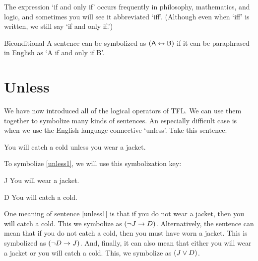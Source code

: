 The expression `if and only if' occurs frequently in philosophy, mathematics, and logic, and sometimes you will see it abbreviated `iff'. (Although even when `iff' is written, we still say `if and only if.') 

\begin{factboxy}{Biconditional}
A sentence can be symbolized as $(\mathsf{A} \leftrightarrow \mathsf{B})$ if it can be paraphrased in English as `A if and only if B'.
\end{factboxy}
	

\section{Unless}\label{s:unless}
We have now introduced all of the logical operators of TFL. We can use them together to symbolize many kinds of sentences. An especially difficult case is when we use the English-language connective `unless'. Take this sentence:

\begin{earg}
\item[\ex{unless1}] You will catch a cold unless you wear a jacket. 
\end{earg}
To symbolize \ref{unless1}, we will use this symbolization key:
	\begin{ekey}
		\item[J] You will wear a jacket.
		\item[D] You will catch a cold.
	\end{ekey}

One meaning of sentence \ref{unless1} is that if you do not wear a jacket, then you will catch a cold. This we symbolize as $({\neg} J \rightarrow D)$. Alternatively, the sentence can mean that if you do not catch a cold, then you must have worn a jacket. This is symbolized as $({\neg} D \rightarrow J)$. And, finally, it can also mean that either you will wear a jacket or you will catch a cold. This, we symbolize as $(J \vee D)$.

